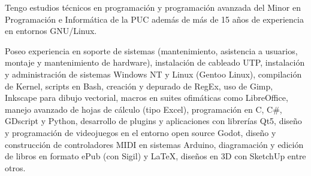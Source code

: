 

\begin{cvparagraph}

Tengo estudios técnicos en programación y programación avanzada del Minor en Programación e Informática de la PUC además de más de 15 años de experiencia en entornos GNU/Linux.

Poseo experiencia en soporte de sistemas (mantenimiento, asistencia a usuarios, montaje y mantenimiento de hardware), instalación de cableado UTP, instalación y administración de sistemas Windows NT y Linux (Gentoo Linux), compilación de Kernel, scripts en Bash, creación y depurado de RegEx, uso de Gimp, Inkscape para dibujo vectorial, macros en suites ofimáticas como LibreOffice, manejo avanzado de hojas de cálculo (tipo Excel), programación en C, C\#, GDscript y Python, desarrollo de plugins y aplicaciones con librerías Qt5, diseño y programación de videojuegos en el entorno open source Godot, diseño y construcción de controladores MIDI en sistemas Arduino, diagramación y edición de libros en formato ePub (con Sigil) y LaTeX, diseños en 3D con SketchUp entre otros.

\end{cvparagraph}